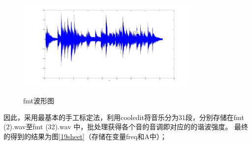 \documentclass{ctexart}
\begin{document}
        \begin{figure}
            \centering
            \includegraphics[width=0.8\textwidth]{fmt/1_9_2.jpg}\\
            \caption{fmt波形图\label{192}}
        \end{figure}


        因此，采用最基本的手工标定法，利用cooledit将音乐分为31段，分别存储在fmt (2).wav至fmt (32).wav 中，批处理获得各个音的音调即对应的的谐波强度。
        最终的得到的结果为图\ref{19sheet}（存储在变量freq和A中）；
\end{document}
